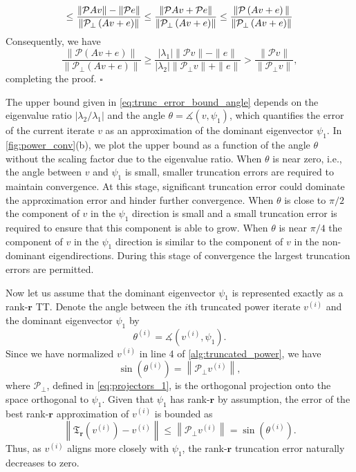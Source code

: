 \documentclass[10pt,preprint]{elsarticle}
\newenvironment{proof}{{\noindent \bf \em Proof:}}{\hfill$\square$}
\def\T{\mathfrak{T}}
\def\P{\mathcal{P}}
\def\r{\bm r}
\begin{document}
\begin{proof}
\begin{equation}
\leq \frac{\| \P Av\| - \|\P e\|}{ \left\|\P_{\perp} \left(Av + e\right) \right\|} 
\leq \frac{\| \P Av + \P e\|}{ \left\|\P_{\perp} \left(Av + e\right) \right\|} \\
\leq \frac{\| \P \left(Av + e\right)\|}{ \left\|\P_{\perp} \left(Av + e\right) \right\|} 
\end{equation}
Consequently, we have 
\begin{equation}
\frac{\| \P \left(Av + e\right)\|}{ \left\|\P_{\perp} \left(Av + e\right) \right\|}  \geq \frac{|\lambda_1| \|\P v\| - \|e\|}{|\lambda_2| \|\P_{\perp} v\| + \|e\|} > \frac{\|\P v\|}{\|\P_{\perp} v\|}, 
\end{equation} 
completing the proof. 
\end{proof}

\noindent
The upper bound given in \eqref{eq:trunc_error_bound_angle} depends on the eigenvalue ratio $|\lambda_2/\lambda_1|$ and the angle $\theta = \measuredangle(v,\psi_1)$, which quantifies the error of the current iterate $v$ as an approximation of the dominant eigenvector $\psi_1$. In \cref{fig:power_conv}(b), we plot the upper bound as a function of the angle $\theta$ without the scaling factor due to the eigenvalue ratio. When $\theta$ is near zero, i.e., the angle between $v$ and $\psi_1$ is small, smaller truncation errors are required to maintain convergence. At this stage, significant truncation error could dominate the approximation error and hinder further convergence. When $\theta$ is close to $\pi/2$ the component of $v$ in the $\psi_1$ direction is small and a small truncation error is required to ensure that this component is able to grow. When $\theta$ is near $\pi/4$ the component of $v$ in the $\psi_1$ direction is similar to the component of $v$ in the non-dominant eigendirections. During this stage of convergence the largest truncation errors are permitted. 

Now let us assume that the dominant eigenvector $\psi_1$ is represented exactly as a rank-$\bm r$ TT. Denote the angle between the $i$th truncated power iterate $v^{(i)}$ and the dominant eigenvector $\psi_1$ by 
\begin{equation}
\theta^{(i)} = \measuredangle\left(v^{(i)},\psi_1\right). 
\end{equation}
Since we have normalized $v^{(i)}$ in line 4 of \cref{alg:truncated_power}, we have \begin{equation}
\sin\left(\theta^{(i)}\right) = \left\|\P_{\perp} v^{(i)}\right\|, 
\end{equation}
where $\P_{\perp}$, defined in \eqref{eq:projectors_1}, is the orthogonal projection onto the space orthogonal to $\psi_1$. Given that $\psi_1$ has rank-$\r$ by assumption, the error of the best rank-$\r$ approximation of $v^{(i)}$ is bounded as 
\begin{equation}
\left\|\T_{\r}\left(v^{(i)}\right) - v^{(i)}\right\| \leq \left\|\P_{\perp} v^{(i)}\right\| = \sin\left(\theta^{(i)}\right). 
\end{equation} 
Thus, as $v^{(i)}$ aligns more closely with $\psi_1$, the rank-$\r$ truncation error naturally decreases to zero. 
\end{document}
